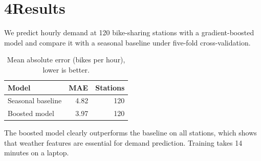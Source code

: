 \documentclass[11pt]{article}
\begin{document}
\section*{4\quad Results}
We predict hourly demand at 120 bike-sharing stations with a gradient-boosted
model and compare it with a seasonal baseline under five-fold cross-validation.

\begin{table}[h]
\centering
\caption{Mean absolute error (bikes per hour), lower is better.}
\begin{tabular}{@{}lrr@{}}
\toprule
Model & MAE & Stations \\
\midrule
Seasonal baseline & 4.82 & 120 \\
Boosted model     & 3.97 & 120 \\
\bottomrule
\end{tabular}
\end{table}

The boosted model clearly outperforms the baseline on all stations, which
shows that weather features are essential for demand prediction.
Training takes 14 minutes on a laptop.
\end{document}
